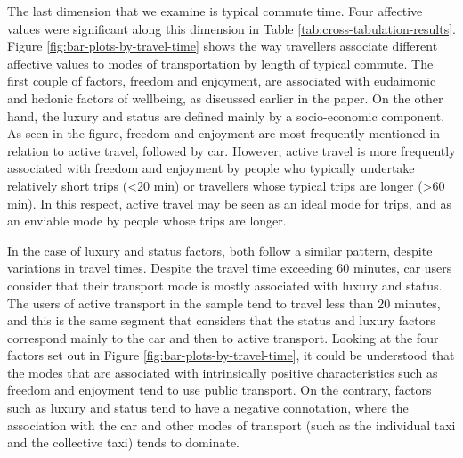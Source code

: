 \documentclass[]{elsarticle} %
\begin{document}
The last dimension that we examine is typical commute time. Four
affective values were significant along this dimension in Table
\ref{tab:cross-tabulation-results}. Figure
\ref{fig:bar-plots-by-travel-time} shows the way travellers associate
different affective values to modes of transportation by length of
typical commute. The first couple of factors, freedom and enjoyment, are
associated with eudaimonic and hedonic factors of wellbeing, as
discussed earlier in the paper. On the other hand, the luxury and status
are defined mainly by a socio-economic component. As seen in the figure,
freedom and enjoyment are most frequently mentioned in relation to
active travel, followed by car. However, active travel is more
frequently associated with freedom and enjoyment by people who typically
undertake relatively short trips (\textless20 min) or travellers whose
typical trips are longer (\textgreater60 min). In this respect, active
travel may be seen as an ideal mode for trips, and as an enviable mode
by people whose trips are longer.

In the case of luxury and status factors, both follow a similar pattern,
despite variations in travel times. Despite the travel time exceeding 60
minutes, car users consider that their transport mode is mostly
associated with luxury and status. The users of active transport in the
sample tend to travel less than 20 minutes, and this is the same segment
that considers that the status and luxury factors correspond mainly to
the car and then to active transport. Looking at the four factors set
out in Figure \ref{fig:bar-plots-by-travel-time}, it could be understood
that the modes that are associated with intrinsically positive
characteristics such as freedom and enjoyment tend to use public
transport. On the contrary, factors such as luxury and status tend to
have a negative connotation, where the association with the car and
other modes of transport (such as the individual taxi and the collective
taxi) tends to dominate.
\end{document}
